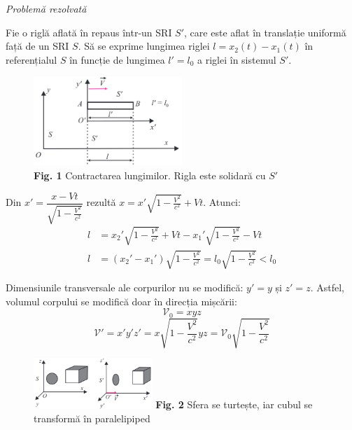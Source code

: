 \documentclass[a4paper, 12pt]{article}
\newcommand{\parbreak}{\vspace{1cm}}
\newcommand{\figcaption}[2]{\scriptsize{\textbf{Fig. #1} #2}}
\newcommand{\lorentzradical}{\sqrt{1 - \frac{V^2}{c^2}}}
\begin{document}
{\Large\emph{Problemă rezolvată}}
\vspace{0.5cm}

Fie o riglă aflată în repaus într-un SRI $S'$, care este aflat în translație
uniformă față de un SRI $S$. Să se exprime lungimea riglei \( l = x_2(t) - x_1(t) \)
în referențialul $S$ în funcție de lungimea \( l' = l_0 \)
a riglei în sistemul $S'$.

\begin{figure}[h]
    \centering
    \includegraphics[width=0.5\textwidth]{fig/rigla} \\
    \figcaption{1}{Contractarea lungimilor. Rigla este solidară cu $S'$}
\end{figure}

Din \( x' = \dfrac{x - Vt}{\lorentzradical} \)
rezultă \( x = x' \lorentzradical + Vt \). Atunci:
\begin{align*}
    l &= x_2' \lorentzradical + Vt - x_1' \lorentzradical - Vt \\
    l &= (x_2' - x_1') \lorentzradical = l_0 \lorentzradical < l_0
\end{align*}

\parbreak

Dimensiunile transversale ale corpurilor nu se modifică: \( y' = y \) și \( z' = z \).
Astfel, volumul corpului se modifică doar în direcția mișcării:
\[ \mathscr{V}_0 = xyz \]
\[ \mathscr{V}' = x'y'z' = x\lorentzradical yz = \mathscr{V}_0 \lorentzradical \]

\begin{figure}
    \centering
    \includegraphics[width=0.4\textwidth]{fig/turtit.png}
    \figcaption{2}{Sfera se turtește, iar cubul \linebreak se transformă în paralelipiped}
\end{figure}
\end{document}
